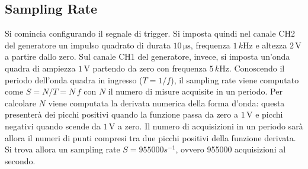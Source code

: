 \documentclass[a4paper,11pt]{article} %
\begin{document}

\subsection{Sampling Rate}
Si comincia configurando il segnale di trigger. Si imposta quindi nel canale CH2 del generatore un impulso quadrato di
durata $10\,\si{\us}$, frequenza $1\,\si{k\hertz}$ e altezza $2\,\si{\volt}$ a partire dallo zero. Sul canale CH1 del
generatore, invece, si imposta un'onda quadra di ampiezza $1\,\si{\volt}$ partendo da zero con frequenza
$5\,\si{k\hertz}$. Conoscendo il periodo dell'onda quadra in ingresso ($T=1/f$), il sampling rate viene computato come
$S = N / T = N \, f$ con $N$ il numero di misure acquisite in un periodo. Per calcolare $N$ viene computata la derivata
numerica della forma d'onda: questa presenterà dei picchi positivi quando la funzione passa da zero a $1\,\si{\volt}$ e
picchi negativi quando scende da $1\,\si{\volt}$ a zero. Il numero di acquisizioni in un periodo sarà allora il numeri
di punti compresi tra due picchi positivi della funzione derivata. Si trova allora un sampling rate $S = 955000 s^{-1}$,
ovvero 955000 acquisizioni al secondo.


\end{document}
